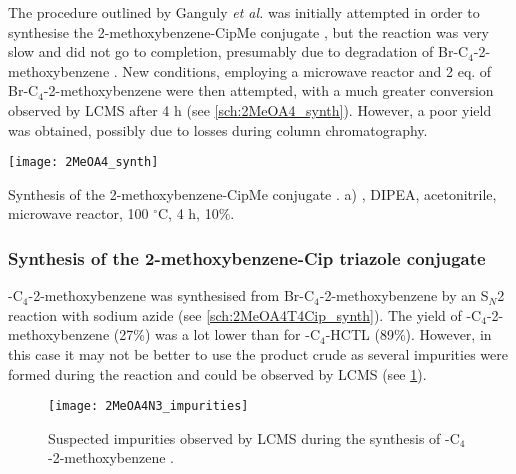 The procedure outlined by Ganguly \textit{et al.}\cite{Ganguly2011} was initially attempted in order to synthesise the 2-methoxybenzene-CipMe conjugate , but the reaction was very slow and did not go to completion, presumably due to degradation of Br-C$_4$-2-methoxybenzene .
New conditions, employing a microwave reactor and 2 eq. of Br-C$_4$-2-methoxybenzene  were then attempted, with a much greater conversion observed by LCMS after 4 h (see \ref{sch:2MeOA4_synth}). However, a poor yield was obtained, possibly due to losses during column chromatography.

\begin{scheme}[H]
	\begin{center}
		\texttt{[image: 2MeOA4\_synth]}
		\caption{Synthesis of the 2-methoxybenzene-CipMe conjugate . 
		a) , DIPEA, acetonitrile, microwave reactor, 100 $^{\circ}$C, 4 h, 10\%.
		 \label{sch:2MeOA4_synth}}
	\end{center}
\end{scheme}

\subsubsection{Synthesis of the 2-methoxybenzene-Cip triazole conjugate }

-C$_4$-2-methoxybenzene  was synthesised from Br-C$_4$-2-methoxybenzene  by an S$_N$2 reaction with sodium azide (see \ref{sch:2MeOA4T4Cip_synth}). The yield of -C$_4$-2-methoxybenzene  (27\%) was a lot lower than for -C$_4$-HCTL  (89\%). However, in this case it may not be better to use the product crude as several impurities were formed during the reaction and could be observed by LCMS (see \ref{fig:2MeOA4N3_impurities}).

\begin{figure}[H]
	\begin{center}
		\texttt{[image: 2MeOA4N3\_impurities]}
		\caption{Suspected impurities observed by LCMS during the synthesis of -C$_4$-2-methoxybenzene .
		\label{fig:2MeOA4N3_impurities}}
	\end{center}
\end{figure}

